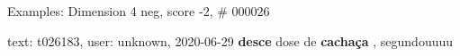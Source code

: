 \begin{frame}{Examples: Dimension 4 neg, score -2, \# 000026}
\footnotesize
\begin{alertblock}{text: t026183, user: unknown, 2020-06-29}
\textbf{desce} dose de \textbf{cachaça} , segundouuuu 
\end{alertblock}
\end{frame}
